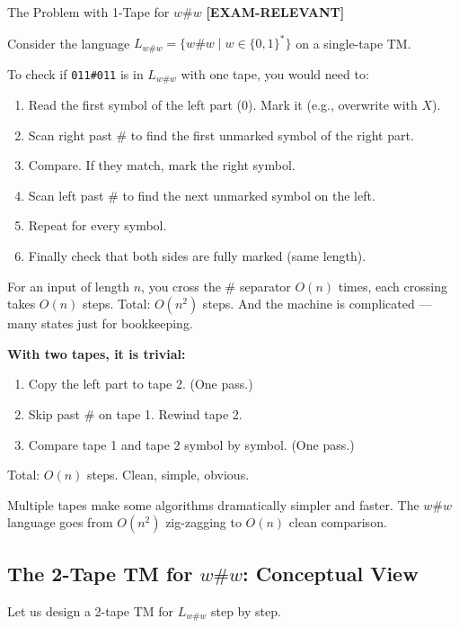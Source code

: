 \documentclass[11pt,a4paper]{article}
\newcommand{\kemark}{\textcolor{red!70!black}{\textbf{[EXAM-RELEVANT]}}}
\newcommand{\kt}[1]{\par\vspace{0.3em}\colorbox{yellow!60}{\parbox{\dimexpr\linewidth-2\fboxsep}{#1}}\vspace{0.3em}}
\begin{document}
\begin{conceptbox}{The Problem with 1-Tape for $w\#w$ \kemark}

Consider the language $L_{w\#w} = \{w\#w \mid w \in \{0,1\}^*\}$ on a single-tape TM.

To check if \texttt{011\#011} is in $L_{w\#w}$ with one tape, you would need to:
\begin{enumerate}[nosep]
\item Read the first symbol of the left part (0). Mark it (e.g., overwrite with $X$).
\item Scan right past \# to find the first unmarked symbol of the right part.
\item Compare. If they match, mark the right symbol.
\item Scan left past \# to find the next unmarked symbol on the left.
\item Repeat for every symbol.
\item Finally check that both sides are fully marked (same length).
\end{enumerate}

For an input of length $n$, you cross the \# separator $O(n)$ times, each crossing takes $O(n)$ steps. Total: $O(n^2)$ steps. And the machine is complicated --- many states just for bookkeeping.

\textbf{With two tapes, it is trivial:}
\begin{enumerate}[nosep]
\item Copy the left part to tape 2. (One pass.)
\item Skip past \# on tape 1. Rewind tape 2.
\item Compare tape 1 and tape 2 symbol by symbol. (One pass.)
\end{enumerate}

Total: $O(n)$ steps. Clean, simple, obvious.

\kt{Multiple tapes make some algorithms dramatically simpler and faster. The $w\#w$ language goes from $O(n^2)$ zig-zagging to $O(n)$ clean comparison.}
\end{conceptbox}

\subsection{The 2-Tape TM for $w\#w$: Conceptual View}

Let us design a 2-tape TM for $L_{w\#w}$ step by step.
\end{document}
